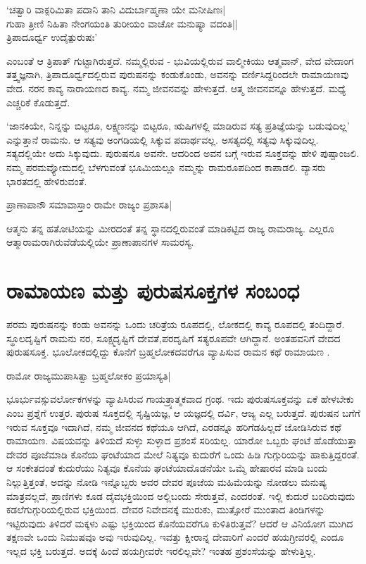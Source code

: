 \begin{shloka}
`ಚತ್ವಾರಿ ವಾಕ್ಪರಿಮಿತಾ ಪದಾನಿ ತಾನಿ ವಿದುರ್ಬಾಹ್ಮಣಾ ಯೇ ಮನೀಷಿಣಃ|\\
ಗುಹಾ ತ್ರೀಣಿ ನಿಹಿತಾ ನೇಂಗಯಂತಿ ತುರೀಯಂ ವಾಚೋ ಮನುಷ್ಯಾ ವದಂತಿ||\\
ತ್ರಿಪಾದೂರ್ಧ್ವ ಉದೈತ್ಪುರುಷಃ'\label{252a}
\end{shloka}

ಎಂಬಂತೆ ಆ ತ್ರಿಪಾತ್ ಗುಟ್ಟಾಗಿರುತ್ತದೆ. ನಮ್ಮಲ್ಲಿರುವ - ಭುವಿಯಲ್ಲಿರುವ ವಾಲ್ಮೀಕಿಯು ಆತ್ಮವಾನ್, ವೇದ ವೇದಾಂಗ ತತ್ತ್ವಜ್ಞನಾಗಿ, ತ್ರಿಪಾದೂರ್ಧ್ವದಲ್ಲಿರುವ ಪುರುಷನನ್ನು ಕಂಡುಕೊಂಡು, ಅವನನ್ನು ವರ್ಣಿಸಿದ್ದರಿಂದಲೇ ರಾಮಾಯಣವು ವೇದ. ನರನ ಕಾವ್ಯ ನಾರಾಯಣದ ಕಾವ್ಯ. ನಮ್ಮ ಜೀವನವನ್ನು ಹೇಳುತ್ತದೆ. ಆತ್ಮ ಜೀವನವನ್ನೂ ಹೇಳುತ್ತದೆ. ಮಧ್ಯೆ ಎಚ್ಚರಿಕೆ ಕೊಡುತ್ತದೆ. 

`ಜಾನಕಿಯೇ, ನಿನ್ನನ್ನು ಬಿಟ್ಟರೂ, ಲಕ್ಷ್ಮಣನನ್ನು ಬಿಟ್ಟರೂ, ಋಷಿಗಳಲ್ಲಿ ಮಾಡಿರುವ ಸತ್ಯ ಪ್ರತಿಜ್ಞೆಯನ್ನು  ಬಡುವುದಿಲ್ಲ' ಎನ್ನುತ್ತಾನೆ ರಾಮನು. ಆ ಸತ್ಯವು ಅಂಗಡಿಯಲ್ಲಿ ಸಿಕ್ಕುವ ಪದಾರ್ಥವಲ್ಲ. ಅಸತ್ಯದಲ್ಲಿ ಸತ್ಯವು ಸಿಕ್ಕುವುದಿಲ್ಲ. ಸತ್ಯದಲ್ಲಿಯೇ ಅದು ಸಿಕ್ಕುವುದು. ಪುರುಷನೂ ಅವನೇ. ಆದರಿಂದ ಅವನ ಬಗ್ಗೆ ಇರುವ ಸೂಕ್ತವನ್ನು ಹೇಳಿ ಪುಷ್ಪಾಂಜಲಿ. ನಮ್ಮ ಪರಮವ್ಯೋಮದಲ್ಲಿ ಬೆಳಗುವಂತೆ ಭೂಮಿಯಲ್ಲೂ ನಮ್ಮನ್ನು ರಾಮರೂಪದಿಂದ ಕಾಪಾಡಲಿ. ವ್ಯಾಸರು ಭಾರತದಲ್ಲಿ ಹೇಳಿರುವಂತೆ.

\begin{shloka}
ಪ್ರಾಣಾಪಾನೌ ಸಮಾವಾಸ್ತಾಂ ರಾಮೇ ರಾಜ್ಯಂ ಪ್ರಶಾಸತಿ|
\end{shloka}

ಆತ್ಮನು ತನ್ನ ಹತೋಟಿಯನ್ನು ಮೀರದಂತೆ ತನ್ನ ಸ್ಥಾನದಲ್ಲಿರುವಂತೆ ಮಾಡಿಕಟ್ಟಿದ ರಾಜ್ಯ ರಾಮರಾಜ್ಯ. ಎಲ್ಲರೂ ಆತ್ಮಾರಾಮರಾಗಿರುವೆಡೆಯಲ್ಲಿಯೇ ಪ್ರಾಣಾಪಾನಗಳ ಸಾಮರಸ್ಯ. 

\section*{ರಾಮಾಯಣ ಮತ್ತು ಪುರುಷಸೂಕ್ತಗಳ ಸಂಬಂಧ}

ಪರಮ ಪುರುಷನನ್ನು ಕಂಡು ಅವನನ್ನು ಒಂದು ಚರಿತ್ರೆಯ ರೂಪದಲ್ಲಿ, ಲೋಕದಲ್ಲಿ ಕಾವ್ಯ ರೂಪದಲ್ಲಿ ತಂದಿದ್ದಾರೆ. ಸ್ಥೂಲದೃಷ್ಟಿಗೆ ರಾಮನು ನರ, ಸೂಕ್ಷ್ಮದೃಷ್ಟಿಗೆ ದೇವತೆ,ಪರದೃಷಿಗೆ ಸತ್ಯರೂಪವೇ ಆಗಿದ್ದಾನೆ. ಅಂತಹವನಿಗೆ ವೇದದ ಪುರುಷಸೂಕ್ತ. ಭೂಲೋಕದಲ್ಲಿದ್ದು ಕೊನೆಗೆ ಬ್ರಹ್ಮಲೋಕದವರೆಗೂ ವ್ಯಾಪಿಸುವ ರಾಮನ ಕಥೆ ರಾಮಾಯಣ . 

\begin{shloka}
ರಾಮೋ ರಾಜ್ಯಮುಪಾಸಿತ್ವಾ ಬ್ರಹ್ಮಲೋಕಂ ಪ್ರಯಾಸ್ಯತಿ|
\end{shloka}

ಭೂರ್ಭುವಸ್ಸುವರ್ಲೋಕಗಳನ್ನು ವ್ಯಾಪಿಸಿರುವ ಗಾಯತ್ರ್ಯಾತ್ಮಕವಾದ ಗ್ರಂಥ. ಇದು ಪುರುಷಸೂಕ್ತವನ್ನು ಏಕೆ ಹೇಳಬೇಕು ಎಂಬ ಪ್ರಶ್ನೆಗೆ ಉತ್ತರ. ಪುರುಷ ಸೂಕ್ತದಲ್ಲಿ ಸೃಷ್ಟಿಯಜ್ಞ, ಆ ಯಜ್ಞದಲ್ಲಿ ದರ್ವಿ, ಆಜ್ಯ ಎಲ್ಲ ಬರುತ್ತದೆ. ಪುರುಷನ ಬಗೆಗೆ ಇರುವ ಸೂಕ್ತವೂ ಇದಾಗಿದೆ, ನಮ್ಮ ಜೀವನದ ಕಥೆಯೂ ಆಗಿದೆ, ಎರಡನ್ನೂ ಹರಿಗೆಡಹಿಲ್ಲದೆ ಜೋಡಿಸಿರುವ ಕಥೆ ರಾಮಾಯಣ. ವಿಷಯವನ್ನು ತಿಳಿಯದೆ ಸುಳ್ಳು ಸುಳ್ಳಾದ ಪ್ರಶಂಸೆ ಸರಿಯಲ್ಲ. ಯಾರೋ ಒಬ್ಬರು ಘಂಟೆ ಹೊಡೆಯುತ್ತಾ ದೇವರ ಪೂಜೆಮಾಡಿ ಕೊನೆಯ ಘಂಟೆಯಾದ ಮೇಲೆ ನಿತ್ಯವೂ ಕುದುರೆಗೆ ಒಂದು ಹಿಡಿ ಗುಗ್ಗುರಿಯನ್ನು ಹಾಕುತ್ತಿದ್ದರಂತೆ. ಆ ಸಂಕೇತದಂತೆ ಕುದುರೆಯು ನಿತ್ಯವೂ ಕೊನೆಯ ಘಂಟೆಯಾದೊಡನೆಯೇ ಒಮ್ಮೆ ಹೇಷಾರವ ಮಾಡಿ ಬಂದು ನಿಲ್ಲುತ್ತಿತ್ತಂತೆ, ಅದನ್ನು ನೋಡಿ ಇನ್ನೊಬ್ಬರು ಅವರ ದೇವರ ಪೂಜೆಯ ಮಹಿಮೆಯನ್ನು ನೋಡಲು ಮನುಷ್ಯ ಮಾತ್ರವಲ್ಲದೆ, ಪ್ರಾಣಿಗಳು ಕೂಡ ದೈವಭಕ್ತಿಯಿಂದ ಅಲ್ಲಿಬಂದು ಸೇರುತ್ತವೆ, ಎಂದರಂತೆ. ಇಲ್ಲಿ ಕುದುರೆ ಬಂದಿರುವುದು ಕಡಲೆಗುಗ್ಗುರಿಯಲ್ಲಿರುವ ಭಕ್ತಿಯಿಂದ. ದೇವರ ನಿವೇದನಕ್ಕೆ ಮುರುಕು, ಮುತ್ಸೋರೆ ಮುಂತಾದ ತಿಂಡಿಗಳನ್ನು ಇಟ್ಟಿರುವುದು ತಿಳಿದರೆ ಮಕ್ಕಳು ಎಷ್ಟು ಭಕ್ತಿಯಿಂದ ಕೊನೆಯವರೆಗೂ ಕುಳಿತಿರುತ್ತವೆ? ಆದರೆ ಆ ವಿನಿಯೋಗ ಮುಗಿದ ತಕ್ಷಣವೇ ಒಂದು ನಿಮುಷವೂ ಅವು ಇರುವುದಿಲ್ಲ. ಇವತ್ತು ಕ್ಷೀರಾನ್ನ ದೇವಾರಿಗೆ ಎಂದರೆ ಹಯಗ್ರೀವರಲ್ಲಿ ಎಂದೂ ಇಲ್ಲದ ಭಕ್ತಿ ಬರುತ್ತದೆ. ಅದಕ್ಕೆ ಹಿಂದೆ ಹಯಗ್ರೀವರೇ ಇರಲಿಲ್ಲವೇ? ಇಂತಹ ಪ್ರಶಂಸೆಯನ್ನು ಹೇಳುತ್ತಿಲ್ಲ. 


